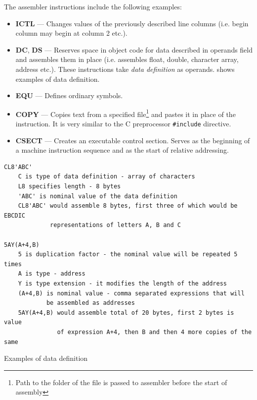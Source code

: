 The assembler instructions include the following examples:
\begin{itemize}
	\item \textbf{ICTL} --- Changes values of the previously described line columns (i.e. begin column may begin at column 2 etc.).
	
	\item \textbf{DC}, \textbf{DS} --- Reserves space in object code for data described in operands field and assembles them in place (i.e. assembles float, double, character array, address etc.). These instructions take \emph{data definition} as operands.  shows examples of data definition.
	
	\item \textbf{EQU} --- Defines ordinary symbols.
	
	\item \textbf{COPY} --- Copies text from a specified file\footnote{Path to the folder of the file is passed to assembler before the start of assembly} and pastes it in place of the instruction. It is very similar to the C preprocessor \texttt{\#include} directive.
	
	\item \textbf{CSECT} --- Creates an executable control section. Serves as the beginning of a machine instruction sequence and as the start of relative addressing.
\end{itemize}

\begin{listing}[t]
	\begin{verbatim}
CL8'ABC'
    C is type of data definition - array of characters
    L8 specifies length - 8 bytes
    'ABC' is nominal value of the data definition
    CL8'ABC' would assemble 8 bytes, first three of which would be EBCDIC
             representations of letters A, B and C

5AY(A+4,B)
    5 is duplication factor - the nominal value will be repeated 5 times
    A is type - address
    Y is type extension - it modifies the length of the address
    (A+4,B) is nominal value - comma separated expressions that will
            be assembled as addresses
    5AY(A+4,B) would assemble total of 20 bytes, first 2 bytes is value
               of expression A+4, then B and then 4 more copies of the same
	\end{verbatim}
	\caption{Examples of data definition}
	\label{data_def_example}
\end{listing}

